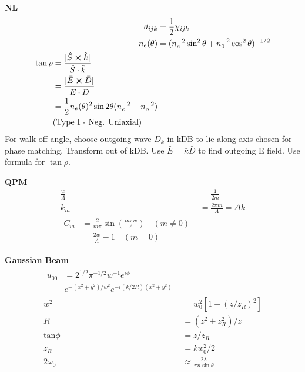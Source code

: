 \documentclass[12pt]{article}
\begin{document}
\begin{multicols}{3}
\textbf{NL}
\begin{align}
  d_{ijk} &= \frac{1}{2} \chi_{ijk}\\ %
  n_{e}(\theta) &= (n_e^{-2}\sin^2\theta + n_0^{-2}\cos^2\theta)^{-1/2}\\ %
  \begin{split}
    \tan\rho &{}= \frac{\lvert\hat{S} \cross \hat{k}\rvert}{\hat{S} \cdot \hat{k}}\\
    &= \frac{\lvert \bar{E} \cross \bar{D} \rvert}{\bar{E} \cdot \bar{D}}\\
    &= \frac{1}{2}n_e(\theta)^2\sin2\theta(n_e^{-2} - n_o^{-2} )\\
    &(\textrm{Type I - Neg. Uniaxial})
  \end{split}
\end{align}
For walk-off angle, choose outgoing wave $D_k$ in kDB to lie along axis chosen for phase matching.
Transform out of kDB. Use $\bar{E} = \bar{\bar{\kappa}} \bar{D}$ to find outgoing E field. Use
formula for $\tan\rho$.

\textbf{QPM}
\begin{align}
  \frac{w}{\Lambda} &= \frac{1}{2m}\\
  k_{m} &= \frac{2\pi m}{\Lambda} = \Delta k\\
  \begin{split}
    C_m &= \frac{2}{m\pi}\sin(\frac{m\pi w}{\Lambda}) \quad (m \neq 0)\\
    &= \frac{2w}{\Lambda} - 1 \quad (m = 0)
  \end{split}
\end{align}

\textbf{Gaussian Beam}
\begin{align}
  \begin{split}
    u_{00} &{}= 2^{1/2}\pi^{-1/2}w^{-1}e^{i\phi}\\
    &e^{-(x^2+y^2)/w^2}e^{-i(k/2R)(x^2+y^2)}
  \end{split}\\
  w^2 &= w_0^2[1+{(z/z_R)}^2]\\
  R &= (z^2 + z_R^2) / z\\
  \textrm{tan}\phi &= z/z_R\\
  z_R &= k w_0^2 / 2\\
  2 \omega_0 &\approx \frac{2\lambda}{\pi n\sin\theta}
\end{align}


\end{multicols}
\end{document}
